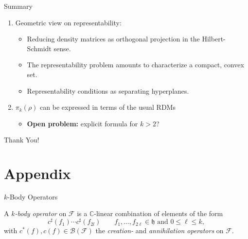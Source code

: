 \documentclass{beamer}
\newcommand{\IC}{\ensuremath{\mathbb{C}}}
\newcommand{\HilbertSpace}{\ensuremath{\mathfrak{h}}}
\newcommand{\FockSpace}{\mathcal{F}}
\begin{document}
\begin{frame}{Summary}
  \begin{enumerate}
    \item Geometric view on representability:
      \begin{itemize}
        \item Reducing density matrices as orthogonal projection in the
          Hilbert-Schmidt sense.
        \item The representability problem amounts to characterize a compact, convex set.
        \item Representability conditions as separating hyperplanes.
      \end{itemize}
    \item $\pi_k(\rho)$ can be expressed in terms of the usual RDMs
      \begin{itemize}
        \item \textbf{Open problem:} explicit formula for $k>2$?
      \end{itemize}
  \end{enumerate}
\end{frame}

\begin{frame}
  \begin{center}
    {\Huge Thank You!}
  \end{center}
\end{frame}

\section{Appendix}
\frame{\sectionpage}

\begin{frame}{$k$-Body Operators}
\begin{definition}
    A \emph{$k$-body operator} on $\FockSpace$ is a $\IC$-linear
    combination of elements of the form
    \begin{equation}
        c^\sharp(f_1)\cdots c^\sharp(f_{2l})\qquad f_1,\ldots,f_{2\ell}\in\HilbertSpace
        \text{ and }0\le \ell\le k,
    \end{equation}
    with $c^*(f),c(f)\in\mathcal{B}(\FockSpace)$ the \emph{creation-} and
    \emph{annihilation operators} on $\FockSpace$.
\end{definition}
\end{frame}
\end{document}
